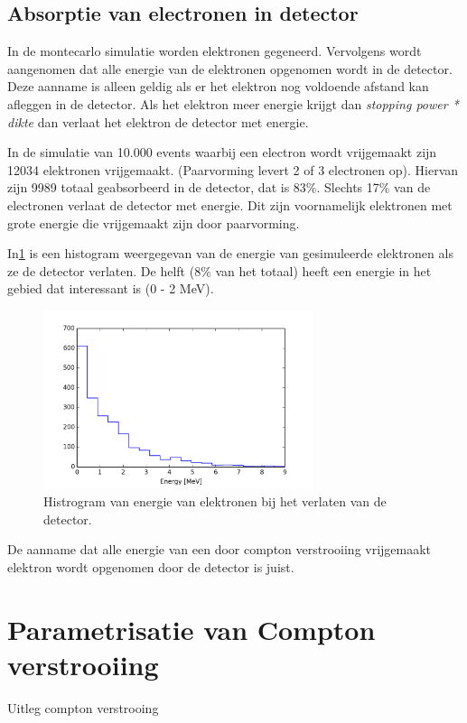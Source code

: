 \documentclass[a4paper,11pt]{article}
\begin{document}
\subsection{Absorptie van electronen in detector}
In de montecarlo simulatie worden elektronen gegeneerd. Vervolgens wordt aangenomen dat alle energie van de elektronen opgenomen wordt in de detector. Deze aanname is alleen geldig als er het elektron nog voldoende afstand kan afleggen in de detector. Als het elektron meer energie krijgt dan \textit{stopping power * dikte} dan verlaat het elektron de detector met energie.

In de simulatie van 10.000 events waarbij een electron wordt vrijgemaakt zijn 12034 elektronen vrijgemaakt. (Paarvorming levert 2 of 3 electronen op). Hiervan zijn 9989 totaal geabsorbeerd in de detector, dat is 83\%. Slechts 17\% van de electronen verlaat de detector met energie. Dit zijn voornamelijk elektronen met grote energie die vrijgemaakt zijn door paarvorming.

In\ref{fig:notabsorbed-hist} is een histogram weergegevan van de energie van gesimuleerde elektronen als ze de detector verlaten. De helft (8\% van het totaal) heeft een energie in het gebied dat interessant is (0 - 2 MeV).


\begin{figure}[t]
  \begin{center}
    \includegraphics[width=0.7\textwidth]{notabsorbed.png}
    \caption{\label{fig:notabsorbed-hist} Histrogram van energie van elektronen bij het verlaten van de detector.}
  \end{center}
\end{figure}

De aanname dat alle energie van een door compton verstrooiing vrijgemaakt elektron wordt opgenomen door de detector is juist.



\section{Parametrisatie van Compton verstrooiing}
Uitleg compton verstrooing
\end{document}
